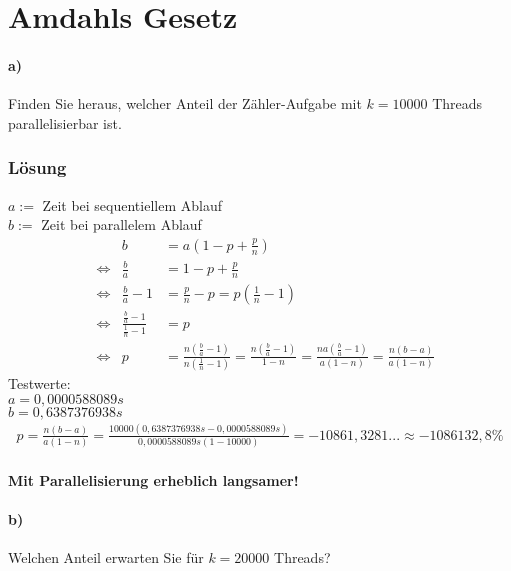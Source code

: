 \documentclass[a4paper]{scrartcl}
\begin{document}
\section{Amdahls Gesetz}

\paragraph{a)} Finden Sie heraus, welcher Anteil der Zähler-Aufgabe mit $ k = 10000 $ Threads parallelisierbar ist.

\subsubsection*{Lösung}
$ a := $ Zeit bei sequentiellem Ablauf\\
$ b := $ Zeit bei parallelem Ablauf
\begin{align*}
&{} & b & = a \left(1 - p + \frac{p}{n}\right)\\
&\Leftrightarrow & \frac{b}{a} & = 1 - p + \frac{p}{n}\\
&\Leftrightarrow & \frac{b}{a} - 1 & = \frac{p}{n} - p = p \left(\frac{1}{n} -1\right)\\
&\Leftrightarrow & \frac{\frac{b}{a} - 1}{\frac{1}{n} -1} & = p\\
&\Leftrightarrow & p & = \frac{n \left(\frac{b}{a} - 1\right)}{n \left(\frac{1}{n} - 1\right)} = \frac{n \left(\frac{b}{a} - 1\right)}{1 - n} = \frac{n a \left(\frac{b}{a} - 1\right)}{a \left(1 - n\right)} = \frac{n \left(b - a\right)}{a \left(1 - n\right)}
\end{align*}
\noindent
Testwerte:\\
$ a = 0,0000588089s $\\
$ b = 0,6387376938s $\\
\begin{align*}
p = \frac{n \left(b - a\right)}{a \left(1 - n\right)} = \frac{10000 \left(0,6387376938s - 0,0000588089s\right)}{0,0000588089s \left(1 - 10000\right)} = -10861,3281... \approx -1086132,8 \%
\end{align*}

\paragraph{Mit Parallelisierung erheblich langsamer!}

\paragraph{b)} Welchen Anteil erwarten Sie für $ k = 20000 $ Threads?
\end{document}
